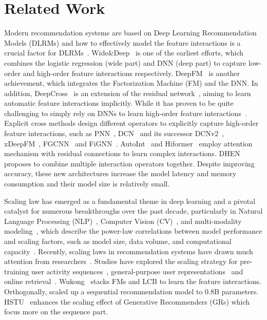 \section{Related Work}
\label{sec:related work}

Modern recommendation systems are based on Deep Learning Recommendation Models (DLRMs) and how to effectively model the feature interactions is a crucial factor for DLRMs~\cite{cheng2016wide,guo2017deepfm,huang2022neural,qu2018product,wang2024flip,wang2021dcn,zhang2022dhen}. Wide\&Deep~\cite{cheng2016wide} is one of the earliest efforts, which combines the logistic regression (wide part) and DNN (deep part) to capture low-order and high-order feature interactions respectively. DeepFM~\cite{guo2017deepfm} is another achievement, which integrates the Factorization Machine (FM) and the DNN. In addition, DeepCross~\cite{shan2016deep} is an extension of the residual network~\cite{he2016deep}, aiming to learn automatic feature interactions implicitly. While it has proven to be quite challenging to simply rely on DNNs to learn high-order feature interactions~\cite{qu2018product,rendle2020neural}.
Explicit cross methods design different operators to explicitly capture high-order feature interactions, such as PNN~\cite{qu2018product}, DCN~\cite{wang2017deep} and its successor DCNv2~\cite{wang2021dcn}, xDeepFM~\cite{lian2018xdeepfm}, FGCNN~\cite{liu2019feature} and FiGNN~\cite{li2019fi}. AutoInt~\cite{song2019autoint} and Hiformer~\cite{gui2023hiformer} employ attention mechanism with residual connections to learn complex interactions. DHEN~\cite{zhang2022dhen} proposes to combine multiple interaction operators together. Despite improving accuracy, these new architectures increase the model latency and memory consumption and their model size is relatively small.


Scaling law has emerged as a fundamental theme in deep learning and a pivotal catalyst for numerous breakthroughs over the past decade, particularly in Natural Language Processing (NLP)~\cite{kaplan2020scaling,hoffmann2022training}, Computer Vision (CV)~\cite{dosovitskiy2020image,zhai2022scaling}, and multi-modality modeling~\cite{radford2021learning,ramesh2021zero}, which describe the power-law correlations between model performance and scaling factors, such as model size, data volume, and computational capacity~\cite{kaplan2020scaling,achiam2023gpt,touvron2023llama,team2024gemma}.
Recently, scaling laws in recommendation systems have drawn much attention from researchers~\cite{guo2024scaling}. Studies have explored the scaling strategy for pre-training user activity sequences~\cite{chitlangia2023scaling}, general-purpose user representations~\cite{shin2023scaling,zhang2024scaling} and online retrieval~\cite{fang2024scaling,wang2024scaling}. Wukong~\cite{zhangwukong} stacks FMs and LCB to learn the feature interactions. Orthogonally, \citet{zhang2024scaling} scaled up a sequential recommendation model to 0.8B parameters. HSTU~\cite{zhaiactions} enhances the scaling effect of Generative Recommenders (GRs) which focus more on the sequence part.
